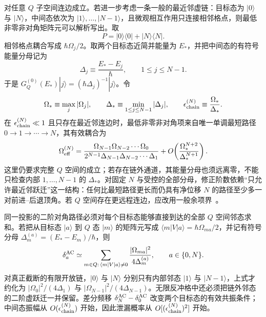  对任意 $Q$ 子空间连边成立。若进一步考虑一条一般的最近邻虚链：目标态为 $|0\rangle$ 与 $|N\rangle$，中间态依次为 $|1\rangle,\ldots,|N-1\rangle$，且微观相互作用只连接相邻格点，则最低非零非对角矩阵元可以解析写出。取
\begin{equation*}
 P=|0\rangle\langle0|+|N\rangle\langle N|.
\end{equation*}
相邻格点耦合写成 $\hbar\Omega_j/2$。取两个目标态近简并能量为 $E_*$，并把中间态的有符号能量分母记为
\begin{equation*}
 \Delta_j\equiv\frac{E_*-E_j}{\hbar},
 \qquad 1\le j\le N-1.
\end{equation*}
于是 $G_Q^{(0)}(E_*)|j\rangle=(\hbar\Delta_j)^{-1}|j\rangle$。令
\begin{equation*}
 \Omega_*\equiv\max_j|\Omega_j|,
 \qquad
 \Delta_*\equiv\min_{1\le j\le N-1}|\Delta_j|,
 \qquad
 \epsilon_{\rm chain}^{(N)}\equiv\frac{\Omega_*}{\Delta_*}.
\end{equation*}
在 $\epsilon_{\rm chain}^{(N)}\ll1$ 且只存在最近邻连边时，最低非零非对角项来自唯一单调最短路径 $0\to1\to\cdots\to N$，其有效耦合为
\begin{equation}
 {
 \Omega_{\rm eff}^{(N)}
 =\frac{\Omega_{N-1}\Omega_{N-2}\cdots\Omega_0}
 {2^{N-1}\Delta_{N-1}\Delta_{N-2}\cdots\Delta_1}
 +O\!\left(\frac{\Omega_*^{N+2}}{\Delta_*^{N+1}}\right).}
 \label{eq:nth-bragg-effective-rabi-dp83}
\end{equation}
这里仍要求完整 $Q$ 空间的成立；若存在链外通道，其能量分母也须远离零，不能只检查内部 $1,\ldots,N-1$ 的 $\Delta_*$。对固定 $N$ 与受控的全部分母，修正阶数依赖“只允许最近邻跃迁”这一结构：任何比最短路径更长而仍具有净位移 $N$ 的路径至少多一对前进--后退顶角。若 $Q$ 空间存在更远程连边，应改用一般余项界~。

同一投影的二阶对角路径必须对每个目标态能够直接到达的全部 $Q$ 空间邻态求和。若把从目标态 $|a\rangle$ 到 $Q$ 态 $|m\rangle$ 的矩阵元写成 $\langle m|V|a\rangle=\hbar\Omega_{ma}/2$，并记有符号分母 $\Delta_m^{(a)}=(E_*-E_m)/\hbar$，则
\begin{equation}
 {
 \delta_a^{\rm AC}
 \simeq
 \sum_{m\in Q:\,\langle m|V|a\rangle\ne0}
 \frac{|\Omega_{ma}|^2}{4\Delta_m^{(a)}},
 \qquad a\in\{0,N\}.}
 \label{eq:nth-bragg-ac-stark-dp83}
\end{equation}
对真正截断的有限开放链，$|0\rangle$ 与 $|N\rangle$ 分别只有内部邻态 $|1\rangle$ 与 $|N-1\rangle$，上式才约化为 $|\Omega_0|^2/(4\Delta_1)$ 与 $|\Omega_{N-1}|^2/(4\Delta_{N-1})$。无限反冲格中还必须把链外邻态的二阶虚跃迁一并保留。差分频移 $\delta_N^{\rm AC}-\delta_0^{\rm AC}$ 改变两个目标态的有效共振条件；中间态振幅从 $O(\epsilon_{\rm chain}^{(N)})$ 开始，因此泄漏概率从 $O[(\epsilon_{\rm chain}^{(N)})^2]$ 开始。


